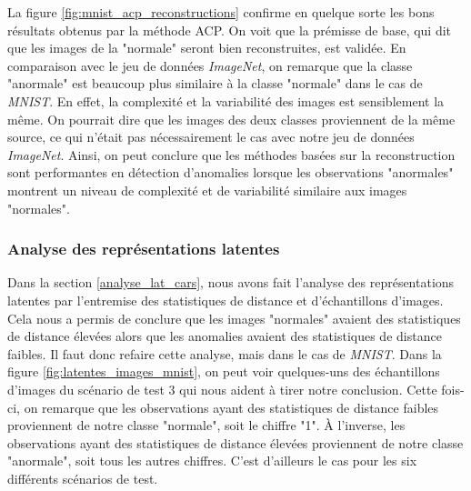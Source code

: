 La figure \ref{fig:mnist_acp_reconstructions} confirme en quelque sorte les bons résultats obtenus par la méthode ACP. On voit que la prémisse de base, qui dit que les images de la "normale" seront bien reconstruites, est validée. En comparaison avec le jeu de données  \textit{ImageNet}, on remarque que la classe "anormale" est beaucoup plus similaire à la classe "normale" dans le cas de \textit{MNIST}. En effet, la complexité et la variabilité des images est sensiblement la même. On pourrait dire que les images des deux classes proviennent de la même source, ce qui n'était pas nécessairement le cas avec notre jeu de données \textit{ImageNet}. Ainsi, on peut conclure que les méthodes basées sur la reconstruction sont performantes en détection d'anomalies lorsque les observations "anormales" montrent un niveau de complexité et de variabilité similaire aux images "normales".

\subsubsection{Analyse des représentations latentes} 

Dans la section \ref{analyse_lat_cars}, nous avons fait l'analyse des représentations latentes par l'entremise des statistiques de distance et d'échantillons d'images. Cela nous a permis de conclure que les images "normales" avaient des statistiques de distance élevées alors que les anomalies avaient des statistiques de distance faibles. Il faut donc refaire cette analyse, mais dans le cas de \textit{MNIST}. Dans la figure \ref{fig:latentes_images_mnist}, on peut voir quelques-uns des échantillons d'images du scénario de test 3 qui nous aident à tirer notre conclusion. Cette fois-ci, on remarque que les observations ayant des statistiques de distance faibles proviennent de notre classe "normale", soit le chiffre "1". À l'inverse, les observations ayant des statistiques de distance élevées proviennent de notre classe "anormale", soit tous les autres chiffres. C'est d'ailleurs le cas pour les six différents scénarios de test.

